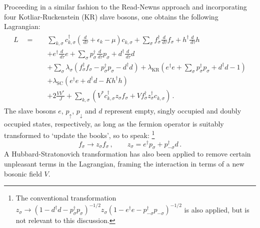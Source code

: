 \documentclass[12pt]{article}
\begin{document}
Proceeding in a similar fashion to the Read-Newns approach and incorporating four Kotliar-Ruckenstein (KR) \cite{KotliarRuckenstein} slave bosons, one obtains the following Lagrangian:
\begin{align}
\begin{split}
L \quad = \quad &\sum_{k,\sigma} c^{\dagger}_{k,\sigma} \left( \frac{d}{\,d\tau} + \epsilon_k - \mu \right) c^{}_{k,\sigma} + \sum_{\sigma} f^{\dagger}_{\sigma} \frac{d}{\,d\tau} f^{}_{\sigma} + h^{\dagger} \frac{d}{\,d\tau}h \\
&+ e^{\dagger} \frac{d}{\,d\tau} e  + \sum_{\sigma} p^{\dagger}_{\sigma} \frac{d}{\,d\tau} p^{}_{\sigma} + d^{\dagger} \frac{d}{\,d\tau} d\\
&+ \sum_{\sigma} \lambda^{}_{\sigma} (f^{\dagger}_{\sigma} f^{}_{\sigma} - p^{\dagger}_{\sigma} p^{}_{\sigma} - d^{\dagger} d^{} ) + \lambda_{\text{KR}} ( e^{\dagger} e + \sum_{\sigma} p^{\dagger}_{\sigma} p^{}_{\sigma} + d^{\dagger} d - 1)\\
&+\lambda_{\text{SC}} ( e^{\dagger} e + d^{\dagger} d - K h^{\dagger} h)\\
&+ 2 \frac{V V^{\ast}}{J} + \sum_{k,\sigma} \left( V^{\ast} c^{\dagger}_{k,\sigma} z^{}_{\sigma} f^{}_{\sigma} + V f^{\dagger}_{\sigma} z^{\dagger}_{\sigma} c^{}_{k,\sigma} \right) \,.\label{eq:Lagrangian}
\end{split}
\end{align}
The slave bosons $ e $, $ p_{\uparrow} $, $ p_{\downarrow} $ and $ d $ represent empty, singly occupied and doubly occupied states, respectively, as long as the fermion operator is suitably transformed to `update the books', so to speak: \footnote{The conventional transformation $ z^{}_{\sigma} \rightarrow (1 - d^{\dagger} d - p^{\dagger}_{\sigma} p^{}_{\sigma})^{- 1 / 2} z^{}_{\sigma} (1 - e^{\dagger} e - p^{\dagger}_{- \sigma} p^{}_{- \sigma})^{- 1 / 2} $ is also applied, but is not relevant to this discussion.} \begin{equation} f^{}_{\sigma} \rightarrow z^{}_{\sigma} f^{}_{\sigma}\,, \qquad z_{\sigma} = e^{\dagger} p^{}_{\sigma} + p^{\dagger}_{-\sigma} d \,. \end{equation} A Hubbard-Stratonovich transformation has also been applied to remove certain unpleasant terms in the Lagrangian, framing the interaction in terms of a new bosonic field $ V $.

\end{document}

